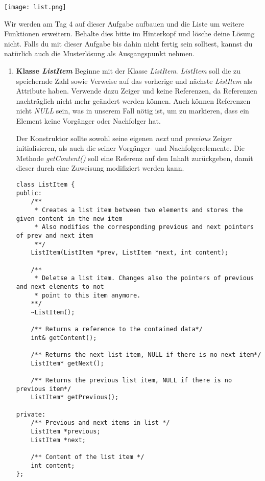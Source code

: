 \begin{center}
	\texttt{[image: list.png]}
\end{center}

Wir werden am Tag 4 auf dieser Aufgabe aufbauen und die Liste um weitere Funktionen erweitern.
Behalte dies bitte im Hinterkopf und lösche deine Lösung nicht.
Falls du mit dieser Aufgabe bis dahin nicht fertig sein solltest, kannst du natürlich auch die Musterlösung als Ausgangspunkt nehmen.

\begin{enumerate}
\item \textbf{Klasse \emph{ListItem}}
Beginne mit der Klasse \emph{ListItem}. 
\emph{ListItem} soll die zu speichernde Zahl sowie Verweise auf das vorherige und nächste \emph{ListItem} als Attribute haben.
Verwende dazu Zeiger und keine Referenzen, da Referenzen nachträglich nicht mehr geändert werden können.
Auch können Referenzen nicht \emph{NULL} sein, was in unserem Fall nötig ist, um zu markieren, dass ein Element keine Vorgänger oder Nachfolger hat.

Der Konstruktor sollte sowohl seine eigenen \emph{next} und \emph{previous} Zeiger initialisieren, als auch die seiner Vorgänger- und Nachfolgerelemente. 
Die Methode \emph{getContent()} soll eine Referenz auf den Inhalt zurückgeben, damit dieser durch eine Zuweisung modifiziert werden kann.

\begin{lstlisting}
class ListItem {
public:
	/** 
	 * Creates a list item between two elements and stores the given content in the new item
	 * Also modifies the corresponding previous and next pointers of prev and next item
	 **/
	ListItem(ListItem *prev, ListItem *next, int content);

	/** 
	 * Deletse a list item. Changes also the pointers of previous and next elements to not
	 * point to this item anymore.
	**/
	~ListItem();

	/** Returns a reference to the contained data*/
	int& getContent();

	/** Returns the next list item, NULL if there is no next item*/
	ListItem* getNext();

	/** Returns the previous list item, NULL if there is no previous item*/
	ListItem* getPrevious();

private:
	/** Previous and next items in list */
	ListItem *previous;
	ListItem *next;

	/** Content of the list item */
	int content;
};
\end{lstlisting}


\end{enumerate}
